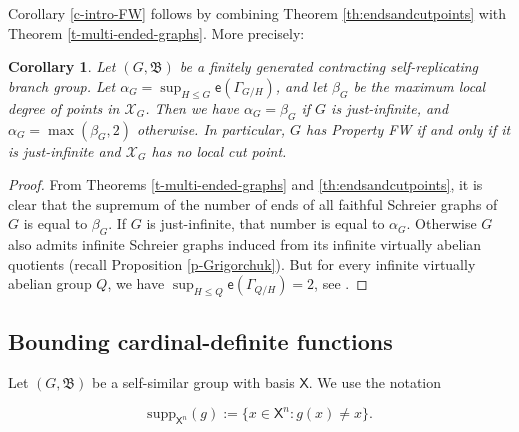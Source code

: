 \documentclass[11pt]{amsart}
\newcommand{\bim}{\mathfrak{B}}
\newcommand{\limg}[1][G]{\mathcal{X}_{#1}}
\newcommand{\alb}{\ensuremath{\mathsf{X}}}%
\newcommand{\esf}{\ensuremath{\mathsf{e}}}
\theoremstyle{definition}
\theoremstyle{plain}
\newtheorem{main thm}{Theorem}
\newtheorem{cor}[defin]{Corollary}{}
\theoremstyle{remark}
\theoremstyle{plain}
\begin{document}
Corollary \ref{c-intro-FW} follows by combining Theorem \ref{th:endsandcutpoints} with Theorem \ref{t-multi-ended-graphs}. More precisely:

\begin{cor}
    Let $(G, \bim)$ be a finitely generated contracting self-replicating branch group. Let $\alpha_G=\sup_{H\le G}\esf(\Gamma_{G/H})$, and let $\beta_G$ be the maximum local degree of points in $\limg$. Then we have $\alpha_G=\beta_G$ if $G$ is just-infinite, and $\alpha_G=\max(\beta_G, 2)$ otherwise. In particular, $G$ has Property FW if and only if it is just-infinite and $\limg$ has no local cut point. 

    
\end{cor}

\begin{proof}
From Theorems \ref{t-multi-ended-graphs} and \ref{th:endsandcutpoints}, it is clear that the supremum of the number of ends of all {faithful} Schreier graphs of $G$ is equal to $\beta_G$. If $G$ is just-infinite, that number is equal to $\alpha_G$. Otherwise $G$ also admits infinite Schreier graphs induced from its infinite virtually abelian quotients (recall Proposition \ref{p-Grigorchuk}). But for every infinite virtually abelian group $Q$, we have $\sup_{H\le Q} \esf(\Gamma_{Q/H})=2$, see \cite[\S6.B]{Cor-FWsurvey}.
\end{proof}
\subsection{Bounding cardinal-definite functions}
Let $(G, \bim)$ be a self-similar group with basis $\alb$. We use the notation 

\[\mathrm{supp}_{\alb^n}(g):=\{x\in \alb^n \colon g(x)\neq x\}.\]
\end{document}

